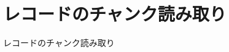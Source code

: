 \documentclass[../../../main]{subfiles}
\begin{document}
    \section{レコードのチャンク読み取り}\label{sec:phraseology-record_chunk_read}

    レコードのチャンク読み取り
\end{document}
